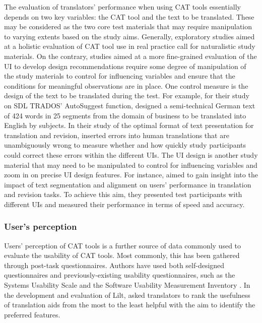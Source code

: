 The evaluation of translators’ performance when using CAT tools essentially depends on two key variables: the CAT tool and the text to be translated. These may be considered as the two core test materials that may require manipulation to varying extents based on the study aims. Generally, exploratory studies aimed at a holistic evaluation of CAT tool use in real practice call for naturalistic study materials. On the contrary, studies aimed at a more fine-grained evaluation of the UI to develop design recommendations require some degree of manipulation of the study materials to control for influencing variables and ensure that the conditions for meaningful observations are in place. One control measure is the design of the text to be translated during the test. For example, for their study on SDL TRADOS’ AutoSuggest function, \citet{o2010keeping} designed a semi-technical German text of 424 words in 25 segments from the domain of business to be translated into English by subjects. In their study of the optimal format of text presentation for translation and revision, \citet{laubli2020machine} inserted errors into human translations that are unambiguously wrong to measure whether and how quickly study participants could correct these errors within the different UIs. The UI design is another study material that may need to be manipulated to control for influencing variables and zoom in on precise UI design features. For instance, \citet{laubli2020machine} aimed to gain insight into the impact of text segmentation and alignment on users’ performance in translation and revision tasks. To achieve this aim, they presented test participants with different UIs and measured their performance in terms of speed and accuracy.



\subsubsection{User's perception}


Users’ perception of CAT tools is a further source of data commonly used to evaluate the usability of CAT tools. Most commonly, this has been gathered through post-task questionnaires. Authors have used both self-designed questionnaires and previously-existing usability questionnaires, such as the Systems Usability Scale \citep{coppers2018intellingo} and the Software Usability Measurement Inventory \citep{vargas2019usability}. In the development and evaluation of Lilt, \citet{green2014predictive} asked translators to rank the usefulness of translation aids from the most to the least helpful with the aim to identify the preferred features.

